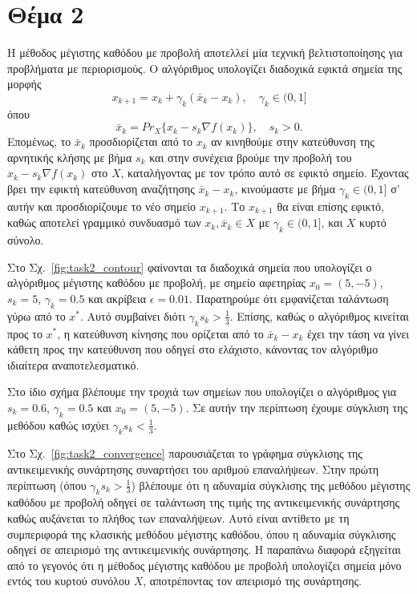 \documentclass[a4paper,12pt]{article}
\begin{document}
\section*{Θέμα 2}
Η μέθοδος μέγιστης καθόδου με προβολή αποτελλεί μία τεχνική βελτιστοποίησης για προβλήματα με περιορισμούς.
Ο αλγόριθμος υπολογίζει διαδοχικά εφικτά σημεία της μορφής
\[
x_{k+1} = x_k + \gamma_k (\bar{x}_k - x_k), \quad \gamma_k \in (0, 1]
\]
όπου
\[
\bar{x}_k = Pr_X\{x_k - s_k \nabla f(x_k)\}, \quad s_k > 0.
\]
Επομένως, το $\bar{x}_k$ προσδιορίζεται από το $x_k$ αν κινηθούμε στην κατεύθυνση της αρνητικής κλήσης με
βήμα $s_k$ και στην συνέχεια βρούμε την προβολή του $x_k - s_k \nabla f(x_k)$ στο $X$, καταλήγοντας με τον
τρόπο αυτό σε εφικτό σημείο. Έχοντας βρει την εφικτή κατεύθυνση αναζήτησης $\bar{x}_k - x_k$, κινούμαστε με
βήμα $\gamma_k \in (0, 1]$ σ' αυτήν και προσδιορίζουμε το νέο σημείο $x_{k+1}$. Το \(x_{k+1}\) θα είναι 
επίσης εφικτό, καθώς αποτελεί γραμμικό συνδυασμό των $x_k, \bar{x}_k \in X$ με $\gamma_k \in (0, 1]$, 
και $X$ κυρτό σύνολο.
 
Στο Σχ.~\ref{fig:task2_contour} φαίνονται τα διαδοχικά σημεία που υπολογίζει ο αλγόριθμος μέγιστης καθόδου με 
προβολή, με σημείο αφετηρίας $x_0 = (5, -5)$, $s_k = 5$, $\gamma_k = 0.5$ και ακρίβεια $\epsilon = 0.01$. 
Παρατηρούμε ότι εμφανίζεται ταλάντωση γύρω από το $x^*$. Αυτό συμβαίνει διότι $\gamma_k s_k > \frac{1}{3}$. Επίσης,
καθώς ο αλγόριθμος κινείται προς το $x^*$, η κατεύθυνση κίνησης που ορίζεται από το $\bar{x}_k - x_k$ έχει
την τάση να γίνει κάθετη προς την κατεύθυνση που οδηγεί στο ελάχιστο, κάνοντας τον αλγόριθμο ιδιαίτερα 
αναποτελεσματικό.

Στο ίδιο σχήμα βλέπουμε την τροχιά των σημείων που υπολογίζει ο αλγόριθμος για $s_k = 0.6$, $\gamma_k = 0.5$ και
$x_0 = (5, -5)$. Σε αυτήν την περίπτωση έχουμε σύγκλιση της μεθόδου καθώς ισχύει $\gamma_k s_k < \frac{1}{3}$.

Στο Σχ.~\ref{fig:task2_convergence} παρουσιάζεται το γράφημα σύγκλισης της αντικειμενικής συνάρτησης 
συναρτήσει του αριθμού επαναλήψεων. Στην πρώτη περίπτωση (όπου $\gamma_k s_k > \frac{1}{3}$) βλέπουμε ότι η αδυναμία 
σύγκλισης της μεθόδου μέγιστης καθόδου με προβολή οδηγεί σε ταλάντωση της τιμής της αντικειμενικής συνάρτησης καθώς
αυξάνεται το πλήθος των επαναλήψεων. Αυτό είναι αντίθετο με τη συμπεριφορά της κλασικής μεθόδου μέγιστης καθόδου, 
όπου η αδυναμία σύγκλισης οδηγεί σε απειρισμό της αντικειμενικής συνάρτησης. Η παραπάνω διαφορά εξηγείται από το 
γεγονός ότι η μέθοδος μέγιστης καθόδου με προβολή υπολογίζει σημεία μόνο εντός του κυρτού συνόλου $X$, αποτρέποντας 
τον απειρισμό της συνάρτησης.
\end{document}
